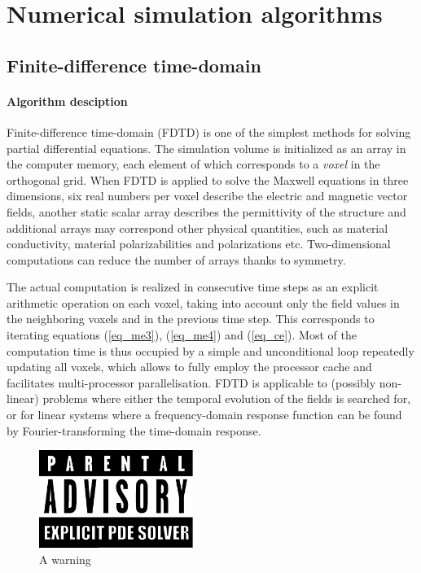 \label{section_expe}
\section{Numerical simulation algorithms} %
\subsection{Finite-difference time-domain} %
\paragraph{Algorithm desciption} %
Finite-difference time-domain (FDTD) is one of the simplest methods for solving partial differential equations. The simulation volume is initialized as an array in the computer memory, each element of which corresponds to a \textit{voxel} in the orthogonal grid. When FDTD is applied to solve the Maxwell equations in three dimensions, six real numbers per voxel describe the electric and magnetic vector fields, another static scalar array describes the permittivity of the structure and additional arrays may correspond other physical quantities, such as material conductivity, material polarizabilities and polarizations etc. Two-dimensional computations can reduce the number of arrays thanks to symmetry.

The actual computation is realized in consecutive time steps as an explicit arithmetic operation on each voxel, taking into account only the field values in the neighboring voxels and in the previous time step. This corresponds to iterating equations (\ref{eq_me3}), (\ref{eq_me4}) and (\ref{eq_ce}). %
Most of the computation time is thus occupied by a simple and unconditional loop repeatedly updating all voxels, which allows to fully employ the processor cache and facilitates multi-processor parallelisation. FDTD is applicable to (possibly non-linear) problems where either the temporal evolution of the fields is searched for, or for linear systems where a frequency-domain response function can be found by Fourier-transforming the time-domain response. 
\begin{figure}[h] \caption{A warning} \label{fg_parental} \centering 
	\includegraphics[width=5cm]{img/Parental_Advisory_label.pdf}
\end{figure}


